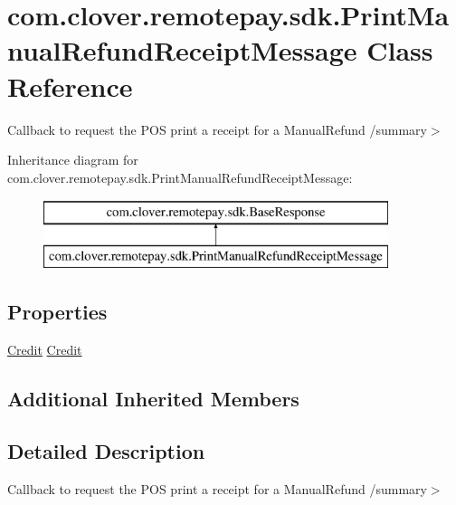 \hypertarget{classcom_1_1clover_1_1remotepay_1_1sdk_1_1_print_manual_refund_receipt_message}{}\section{com.\+clover.\+remotepay.\+sdk.\+Print\+Manual\+Refund\+Receipt\+Message Class Reference}
\label{classcom_1_1clover_1_1remotepay_1_1sdk_1_1_print_manual_refund_receipt_message}


Callback to request the P\+OS print a receipt for a Manual\+Refund /summary$>$  


Inheritance diagram for com.\+clover.\+remotepay.\+sdk.\+Print\+Manual\+Refund\+Receipt\+Message\+:\begin{figure}[H]
\begin{center}
\leavevmode
\includegraphics[height=2.000000cm]{classcom_1_1clover_1_1remotepay_1_1sdk_1_1_print_manual_refund_receipt_message}
\end{center}
\end{figure}
\subsection*{Properties}
\begin{DoxyCompactItemize}
\item 
\hyperlink{classcom_1_1clover_1_1sdk_1_1v3_1_1payments_1_1_credit}{Credit} \hyperlink{classcom_1_1clover_1_1remotepay_1_1sdk_1_1_print_manual_refund_receipt_message_a93514623c2763a437652ce93fc59f07f}{Credit}
\end{DoxyCompactItemize}
\subsection*{Additional Inherited Members}


\subsection{Detailed Description}
Callback to request the P\+OS print a receipt for a Manual\+Refund /summary$>$ 

